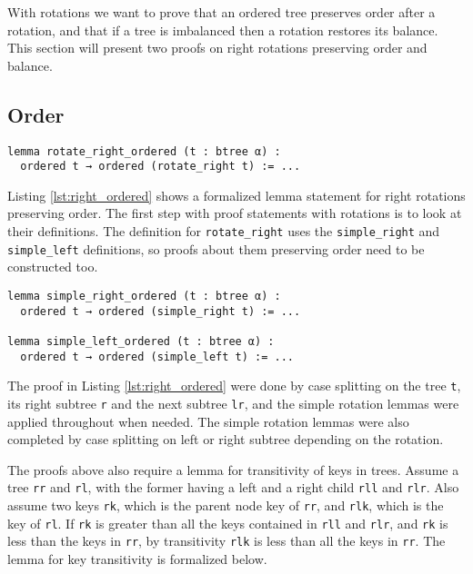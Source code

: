 With rotations we want to prove that an ordered tree preserves order after a rotation, and that if a tree is imbalanced then a rotation restores its balance. This section will present two proofs on right rotations preserving order and balance.

\subsection*{Order}
\begin{lstlisting}[caption=\empty, label={lst:right_ordered}]
lemma rotate_right_ordered (t : btree α) :
  ordered t → ordered (rotate_right t) := ...
\end{lstlisting}

Listing \ref{lst:right_ordered} shows a formalized lemma statement for right rotations preserving order. The first step with proof statements with rotations is to look at their definitions. The definition for \lstinline{rotate_right} uses the \lstinline{simple_right} and \lstinline{simple_left} definitions, so proofs about them preserving order need to be constructed too.

\begin{lstlisting}[caption=\empty, label={lst:simple_ordered}]
lemma simple_right_ordered (t : btree α) :
  ordered t → ordered (simple_right t) := ...

lemma simple_left_ordered (t : btree α) :
  ordered t → ordered (simple_left t) := ...
\end{lstlisting}

The proof in Listing \ref{lst:right_ordered} were done by case splitting on the tree \lstinline{t}, its right subtree \lstinline{r} and the next subtree \lstinline{lr}, and the simple rotation lemmas were applied throughout when needed. The simple rotation lemmas were also completed by case splitting on left or right subtree depending on the rotation.

The proofs above also require a lemma for transitivity of keys in trees. Assume a tree \lstinline{rr} and \lstinline{rl}, with the former having a left and a right child \lstinline{rll} and \lstinline{rlr}. Also assume two keys \lstinline{rk}, which is the parent node key of \lstinline{rr}, and \lstinline{rlk}, which is the key of \lstinline{rl}.
If \lstinline{rk} is greater than all the keys contained in \lstinline{rll} and \lstinline{rlr}, and \lstinline{rk} is less than the keys in \lstinline{rr}, by transitivity \lstinline{rlk} is less than all the keys in \lstinline{rr}. The lemma for key transitivity is formalized below.

